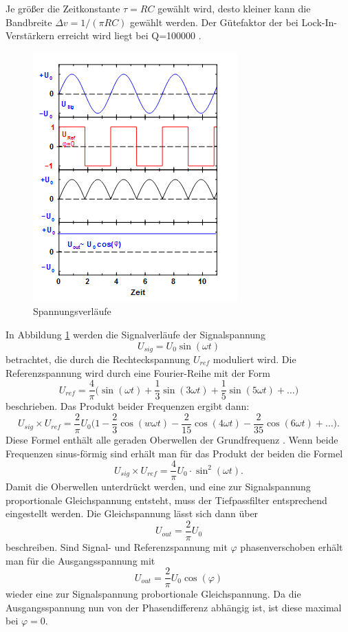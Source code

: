Je größer die Zeitkonstante $\tau =RC$ gewählt wird, desto kleiner kann die
Bandbreite $\Delta v=1/(\pi RC)$ gewählt werden.
Der Gütefaktor der bei Lock-In-Verstärkern erreicht wird liegt bei Q=100000
\cite{303}.
\newpage
\begin{figure}[h]
  \centering
  \includegraphics{Bilder/Spannung.jpg}
  \caption{Spannungsverläufe}
  \label{fig:spannung}
\end{figure}
In Abbildung \ref{fig:spannung} werden die Signalverläufe der Signalspannung
\begin{equation}
  U_{sig}=U_0\sin(\omega t)
\end{equation}
betrachtet, die durch die Rechteckspannung $U_{ref}$ moduliert wird.
Die Referenzspannung wird durch eine Fourier-Reihe mit der Form
\begin{equation}
  U_{ref}=\frac{4}{\pi}\biggl(\sin(\omega t)+\frac{1}{3}\sin(3\omega t)
  +\frac{1}{5}\sin(5\omega t)+\dots\biggr)
\end{equation}
beschrieben. Das Produkt beider Frequenzen ergibt dann:
\begin{equation}
  U_{sig}\times U_{ref} =\frac{2}{\pi}U_0\biggl(1-\frac{2}{3}\cos(w\omega t)
  -\frac{2}{15}\cos(4\omega t)-\frac{2}{35}\cos(6\omega t)+\dots\biggr).
\end{equation}
Diese Formel enthält alle geraden Oberwellen der Grundfrequenz \omega.
Wenn beide Frequenzen sinus-förmig sind erhält man für das Produkt der beiden
die Formel
\begin{equation}
  U_{sig}\times U_{ref}=\frac{4}{\pi}U_0 \cdot \sin^2(\omega t).
\end{equation}
Damit die Oberwellen unterdrückt werden, und eine zur Signalspannung proportionale
Gleichspannung entsteht, muss der Tiefpassfilter entsprechend eingestellt werden.
Die Gleichspannung lässt sich dann über
\begin{equation}
  U_{out}=\frac{2}{\pi}U_0
\end{equation}
beschreiben.
Sind Signal- und Referenzspannung mit $\varphi$ phasenverschoben erhält man für
die Ausgangsspannung mit
\begin{equation}
  U_{out}=\frac{2}{\pi}U_0\cos(\varphi) \label{eqn:out}
\end{equation}
wieder eine zur Signalspannung probortionale Gleichspannung. Da die Ausgangsspannung
nun von der Phasendifferenz abhängig ist, ist diese maximal bei $\varphi=0$.
